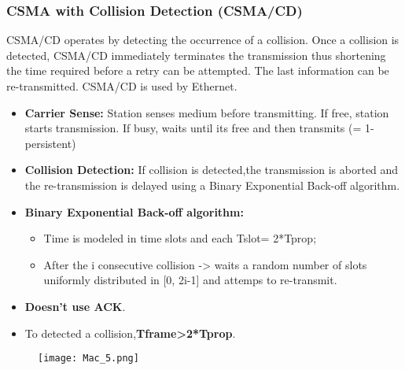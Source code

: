 \documentclass[../resumosRCOM.tex]{subfiles}
\begin{document}
\subsubsection{CSMA with Collision Detection (CSMA/CD)}
CSMA/CD operates by detecting the occurrence of a collision. Once a collision is detected, CSMA/CD immediately terminates the transmission thus shortening the time required before a retry can be attempted. The last information can be re-transmitted.
\newline
CSMA/CD is used by Ethernet.
\newline
\begin{itemize}
    \item \textbf{Carrier Sense:} Station senses medium before transmitting. If free, station starts transmission. If busy, waits until its free and then transmits (= 1-persistent)
    \item \textbf{Collision Detection:} If collision is detected,the transmission is aborted and the re-transmission is delayed using a Binary Exponential Back-off algorithm.
    \item \textbf{Binary Exponential Back-off algorithm:}
    \begin{itemize}
        \item Time is modeled in time slots and each Tslot= 2*Tprop;
        \item After the i consecutive collision -> waits a random number of slots uniformly distributed in [0, 2i-1] and attemps to re-transmit.
    \end{itemize}
    \item \textbf{Doesn't use ACK}.
    \item To detected a collision,\textbf{Tframe>2*Tprop}.
\end{itemize}
\begin{figure}[H]
    \centering
    \texttt{[image: Mac\_5.png]}
\end{figure}
\end{document}
